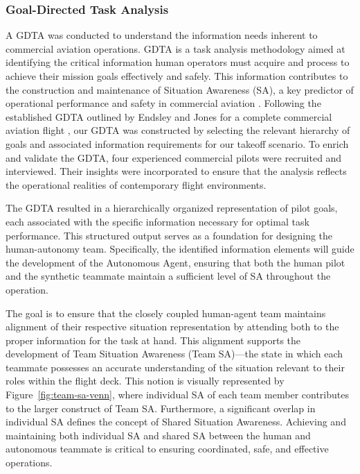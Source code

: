 \documentclass[12pt,a4paper]{article} %
\begin{document}
	\subsubsection{Goal-Directed Task Analysis}
	A GDTA was conducted to understand the information needs inherent to commercial aviation operations. GDTA is a task analysis methodology aimed at identifying the critical information human operators must acquire and process to achieve their mission goals effectively and safely. This information contributes to the construction and maintenance of Situation Awareness (SA), a key predictor of operational performance and safety in commercial aviation \parencite{endsley_here_2017}. %
	Following the established GDTA outlined by Endsley and Jones for a complete commercial aviation flight \parencite{endsley_designing_2003}, our GDTA was constructed by selecting the relevant hierarchy of goals and associated information requirements for our takeoff scenario. To enrich and validate the GDTA, four experienced commercial pilots were recruited and interviewed. Their insights were incorporated to ensure that the analysis reflects the operational realities of contemporary flight environments.

	The GDTA resulted in a hierarchically organized representation of pilot goals, each associated with the specific information necessary for optimal task performance. This structured output serves as a foundation for designing the human-autonomy team. Specifically, the identified information elements will guide the development of the Autonomous Agent, ensuring that both the human pilot and the synthetic teammate maintain a sufficient level of SA throughout the operation.

	The goal is to ensure that the closely coupled human-agent team maintains alignment of their respective situation representation by attending both to the proper information for the task at hand. This alignment supports the development of Team Situation Awareness (Team SA)—the state in which each teammate possesses an accurate understanding of the situation relevant to their roles within the flight deck.
	This notion is visually represented by Figure~\ref{fig:team-sa-venn}, where individual SA of each team member contributes to the larger construct of Team SA. Furthermore, a significant overlap in individual SA defines the concept of Shared Situation Awareness. Achieving and maintaining both individual SA and shared SA between the human and autonomous teammate is critical to ensuring coordinated, safe, and effective operations.
\end{document}
